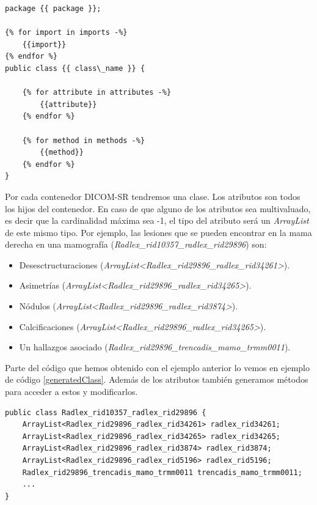 \begin{lstlisting}[label=templateClass,caption=Plantilla para una clase genérica]
package {{ package }};

{% for import in imports -%}
    {{import}}
{% endfor %}
public class {{ class\_name }} {

    {% for attribute in attributes -%}
        {{attribute}}
    {% endfor %}

    {% for method in methods -%}
        {{method}}
    {% endfor %}
}
\end{lstlisting}

 Por cada contenedor DICOM-SR tendremos una clase. Los atributos son todos los hijos del contenedor. En caso de que alguno de los atributos sea multivaluado, es decir que la cardinalidad máxima sea -1, el tipo del atributo será un \textit{ArrayList} de este mismo tipo. Por ejemplo, las lesiones que se pueden encontrar en la mama derecha en una mamografía  (\emph{Radlex\_rid10357\_radlex\_rid29896}) son: 
\begin{itemize}
\item Desesctructuraciones (\emph{ArrayList<Radlex\_rid29896\_radlex\_rid34261>}).
\item Asimetrías (\emph{ArrayList<Radlex\_rid29896\_radlex\_rid34265>}).
\item Nódulos (\emph{ArrayList<Radlex\_rid29896\_radlex\_rid3874>}).
\item Calcificaciones (\emph{ArrayList<Radlex\_rid29896\_radlex\_rid34265>}).
\item Un hallazgos asociado (\emph{Radlex\_rid29896\_trencadis\_mamo\_trmm0011}).
\end{itemize}

Parte del código que hemos obtenido con el ejemplo anterior lo vemos en ejemplo de código \ref{generatedClass}. Además de los atributos también generamos métodos para acceder a estos y modificarlos.\par

\begin{lstlisting}[label=generatedClass,caption=Clase generada automáticamente]
public class Radlex_rid10357_radlex_rid29896 {
    ArrayList<Radlex_rid29896_radlex_rid34261> radlex_rid34261;
    ArrayList<Radlex_rid29896_radlex_rid34265> radlex_rid34265;
    ArrayList<Radlex_rid29896_radlex_rid3874> radlex_rid3874;
    ArrayList<Radlex_rid29896_radlex_rid5196> radlex_rid5196;
    Radlex_rid29896_trencadis_mamo_trmm0011 trencadis_mamo_trmm0011;
    ...
}
\end{lstlisting}

